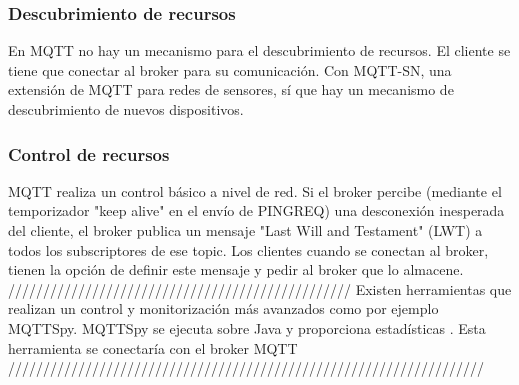 \documentclass[12pt, twoside]{book}
\begin{document}
\subsubsection*{Descubrimiento de recursos}
En MQTT no hay un mecanismo para el descubrimiento de recursos. El cliente se tiene que conectar al broker para su comunicación. Con MQTT-SN, una extensión de MQTT para redes de sensores, sí que hay un mecanismo de descubrimiento de nuevos dispositivos.
\subsubsection*{Control de recursos}
MQTT realiza un control básico a nivel de red. Si el broker percibe (mediante el temporizador "keep alive" en el envío de PINGREQ) una desconexión inesperada del cliente, el broker publica un mensaje "Last Will and Testament" (LWT) a todos los subscriptores de ese topic. Los clientes cuando se conectan al broker, tienen la opción de definir este mensaje y  pedir al broker que lo almacene.\\
/////////////////////////////////////////////////
Existen herramientas que realizan un control y monitorización más avanzados como por ejemplo MQTTSpy. MQTTSpy se ejecuta sobre Java y proporciona estadísticas . Esta herramienta se conectaría con el broker MQTT ////////////////////////////////////////////////////////////////////
\end{document}
